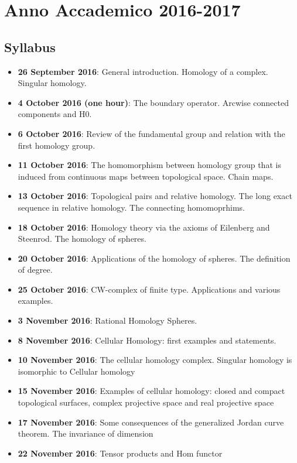 \documentclass[10pt, twoside=false, x11names]{scrbook}
\begin{document}
\newpage

\chapter*{Anno Accademico 2016-2017}

\section*{Syllabus}

\begin{itemize}
\item \textbf{26 September 2016}: General introduction. Homology of a complex. Singular homology.
\item \textbf{4 October 2016 (one hour)}: The boundary operator. Arcwise connected components and H0.
\item \textbf{6 October 2016}: Review of the fundamental group and relation with the first homology group.
\item \textbf{11 October 2016}: The homomorphism between homology group that is induced from continuous maps between topological space. Chain maps.
\item \textbf{13 October 2016}: Topological pairs and relative homology. The long exact sequence in relative homology. The connecting homomoprhims.
\item \textbf{18 October 2016}: Homology theory via the axioms of Eilenberg and Steenrod. The homology of spheres.
\item \textbf{20 October 2016}: Applications of the homology of spheres. The definition of degree.
\item \textbf{25 October 2016}: CW-complex of finite type. Applications and various examples.
\item \textbf{3 November 2016}: Rational Homology Spheres.
\item \textbf{8 November 2016}: Cellular Homology: first examples and statements.
\item \textbf{10 November 2016}: The cellular homology complex. Singular homology is isomorphic to Cellular homology
\item \textbf{15 November 2016}: Examples of cellular homology: closed and compact topological surfaces, complex projective space and real projective space
\item \textbf{17 November 2016}: Some consequences of the generalized Jordan curve theorem. The invariance of dimension
\item \textbf{22 November 2016}: Tensor products and Hom functor

\end{itemize}
\end{document}
